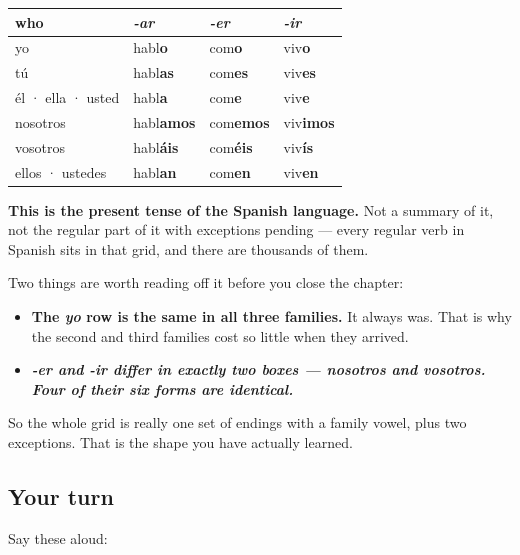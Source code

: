 \begin{grammarlens}[title={Grammar Lens: eighteen forms, and you built each one}]
\noindent
\begin{tabularx}{\linewidth}{@{}>{\raggedright\arraybackslash}X>{\raggedright\arraybackslash}X>{\raggedright\arraybackslash}X>{\raggedright\arraybackslash}X@{}}
\toprule
\textbf{who} & \textbf{\emph{-ar}} & \textbf{\emph{-er}} & \textbf{\emph{-ir}} \\
\midrule
yo & habl\textbf{o} & com\textbf{o} & viv\textbf{o} \\
tú & habl\textbf{as} & com\textbf{es} & viv\textbf{es} \\
él · ella · usted & habl\textbf{a} & com\textbf{e} & viv\textbf{e} \\
nosotros & habl\textbf{amos} & com\textbf{emos} & viv\textbf{imos} \\
vosotros & habl\textbf{áis} & com\textbf{éis} & viv\textbf{ís} \\
ellos · ustedes & habl\textbf{an} & com\textbf{en} & viv\textbf{en} \\
\bottomrule
\end{tabularx}

\textbf{This is the present tense of the Spanish language.} Not a summary of it, not the regular part of it with exceptions pending — every regular verb in Spanish sits in that grid, and there are thousands of them.

Two things are worth reading off it before you close the chapter:

\begin{itemize}
\raggedright
  \item \textbf{The \emph{yo} row is the same in all three families.} It always was. That is why the second and third families cost so little when they arrived.
  \item \emph{\textbf{-er\emph{ and }-ir\emph{ differ in exactly two boxes\textbf{ — \emph{nosotros} and \emph{vosotros}. Four of their six forms are identical.}}}}
\end{itemize}

So the whole grid is really one set of endings with a family vowel, plus two exceptions. That is the shape you have actually learned.
\end{grammarlens}

\subsection*{Your turn}
Say these aloud:


